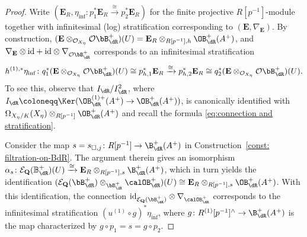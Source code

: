 \begin{proof}
Write $(\mathbf{E}_R,\eta_{\mathrm{inf}}\colon p_1^\ast\mathbf{E}_R\xrightarrow{\cong}p_2^\ast\mathbf{E}_R)$ for the finite projective $R[p^{-1}]$-module together with infinitesimal (log) stratification corresponding to $(\mathbf{E},\nabla_{\mathbf{E}})$.
By construction, $(\mathbf{E}\otimes_{\mathcal{O}_{X_{\eta}}} \mathcal{O}\bB^+_{\dR})(U)=\mathbf{E}_R\otimes_{R[p^{-1}],h}\OB_{\dR}^{+}(A^+)$, and $\nabla_{\mathbf{E}}\otimes\mathrm{id}+\mathrm{id}\otimes\nabla_{\mathcal{O}\bB^{+}_{\dR}}$ corresponds to an infinitesimal stratification 
\[
h^{(1),\ast}\eta_{\mathrm{inf}}\colon q_1^\ast(\mathbf{E}\otimes_{\mathcal{O}_{X_{\eta}}} \mathcal{O}\bB^+_{\dR})(U)\cong p_{h,1}^\ast\mathbf{E}_R\xrightarrow{\cong}p_{h,2}^\ast\mathbf{E}_R \cong q_2^\ast(\mathbf{E}\otimes_{\mathcal{O}_{X_{\eta}}} \mathcal{O}\bB^+_{\dR})(U).
\]
To see this, observe that $I_{\dR}/I_{\dR}^2$, where $I_{\dR}\coloneqq \Ker(\OB_{\dR}^{(1)+}( A^+)\rightarrow\OB_{\dR}^{+}(A^+))$, is canonically identified with $\Omega_{X_\eta/K}(X_\eta)\otimes_{R[p^{-1}]}\OB^+_{\dR}(A^+)$ and recall the formula \eqref{eq:connection and stratification}.

Consider the map $s=s_{\square,j}\colon R[p^{-1}]\rightarrow \B_{\dR}^{+}(A^+)$ in Construction~\ref{const: filtration-on-BdR}. The argument therein gives an isomorphism $\alpha_{s}\colon\mathcal{E}_{\mathbf{Q}}(\mathbb{B}_{\dR}^{+})(U) \xrightarrow{\cong} \mathbf{E}_R\otimes_{R[p^{-1}],s} \B_{\dR}^{+}(A^+)$, which in turn yields the identification 
$(\mathcal{E}_{\mathbf{Q}}(\bB^+_{\dR})\otimes_{\bB^+_{\dR}} \calOB^+_{\dR})(U)\cong\mathbf{E}_R\otimes_{R[p^{-1}],s}\OB_{\dR}^{+}(A^+)$.
With this identification, the connection $\mathrm{id}_{\mathcal{E}_{\mathbf{Q}}(\bB^+_{\dR})}\otimes \nabla_{\calOB^+_{\dR}}$ corresponds to the infinitesimal stratification $(u^{(1)}\circ g)^\ast \eta_{\mathrm{inf}}$, where $g\colon R^{(1)}[p^{-1}]^\wedge\rightarrow \B_{\dR}^{+}(A^+)$ is the map characterized by $g\circ p_1=s=g\circ p_2$. 


\end{proof}
